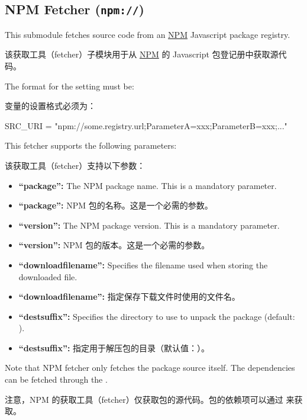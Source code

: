 \subsection{NPM Fetcher (\texttt{npm://})}

This submodule fetches source code from an \href{https://en.wikipedia.org/wiki/Npm_(software)}{NPM} Javascript package registry.

该获取工具（fetcher）子模块用于从 \href{https://en.wikipedia.org/wiki/Npm_(software)}{NPM} 的 Javascript 包登记册中获取源代码。

The format for the  setting must be:

 变量的设置格式必须为：

\begin{pyglist}
SRC_URI = "npm://some.registry.url;ParameterA=xxx;ParameterB=xxx;..."
\end{pyglist}

This fetcher supports the following parameters:

该获取工具（fetcher）支持以下参数：

\begin{itemize}
\setlength\itemsep{1.0em}
\item \textbf{``package'':} The NPM package name. This is a mandatory parameter.
\item \textbf{``package'':} NPM 包的名称。这是一个必需的参数。

\item \textbf{``version'':} The NPM package version. This is a mandatory parameter.
\item \textbf{``version'':} NPM 包的版本。这是一个必需的参数。

\item \textbf{``downloadfilename'':} Specifies the filename used when storing the downloaded file.
\item \textbf{``downloadfilename'':} 指定保存下载文件时使用的文件名。

\item \textbf{``destsuffix'':} Specifies the directory to use to unpack the package (default: ).
\item \textbf{``destsuffix'':} 指定用于解压包的目录（默认值：）。
\end{itemize}

Note that NPM fetcher only fetches the package source itself. The dependencies can be fetched through the .

注意，NPM 的获取工具（fetcher）仅获取包的源代码。包的依赖项可以通过  来获取。

